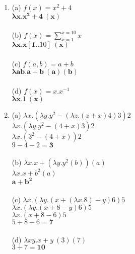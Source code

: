 \documentclass{article}
\begin{document}
\begin{enumerate}\bfseries
    \item (a) $f(x) = x^2 + 4$ \\
    $\mathbf{\lambda x.x^2 + 4\ (x)}$ \\ \\
    (b) $f(x) = \sum_{x=1}^{x=10} x$ \\
    $\mathbf{\lambda x.x[1..10]\  (x)}$ \\ \\
    (c) $f(a, b) = a + b$ \\
    $\mathbf{\lambda ab.a+b\ (a)(b)}$ \\ \\
    (d) $f(x) = x.x^{-1}$ \\
    $\mathbf{\lambda x.1\ (x)}$

    \item (a) $\lambda x.(\lambda y.y^2 - (\lambda z.(z+x)4)3)2$ \\
    $\lambda x.(\lambda y.y^2 - (4+x)3)2$ \\
    $\lambda x.(3^2 - (4+x))2$ \\
    $9 - 4 - 2 = \mathbf{3}$ \\ \\
    (b) $\lambda x.x + (\lambda y.y^2(b))(a)$ \\
    $\lambda x.x + b^2 (a)$ \\
    $\mathbf{a + b^2}$ \\ \\
    (c) $\lambda x.(\lambda y.(x + (\lambda x.8) - y)6)5$ \\
    $\lambda x.(\lambda y.(x + 8 - y)6)5$ \\
    $\lambda x.(x + 8 - 6)5$ \\
    $5 + 8 - 6 = \mathbf{7}$ \\ \\
    (d) $\lambda xy.x + y\ (3)(7)$ \\
    $3 + 7 = \mathbf{10}$


\end{enumerate}
\end{document}
